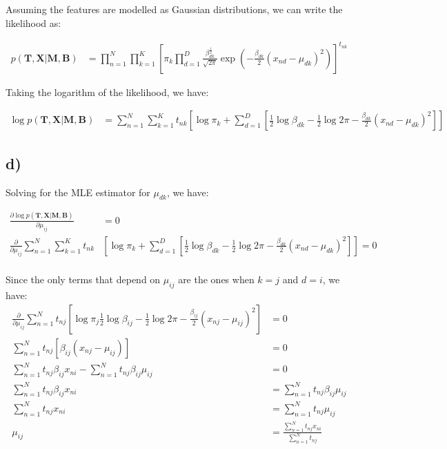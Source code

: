 \documentclass[12pt,a4paper,oneside]{paper}
\begin{document}
Assuming the features are modelled as Gaussian distributions, we can write the likelihood as:

\begin{align*}
    p(\bm{T}, \bm{X} | \bm{M}, \bm{B}) &= \prod_{n=1}^{N} \prod_{k=1}^{K} [\pi_k \prod_{d=1}^{D} \frac{\beta_{dk}^{\frac{1}{2}}}{\sqrt{2\pi}} \exp\left(-\frac{\beta_{dk}}{2} (x_{nd} - \mu_{dk})^2\right)]^{t_{nk}}
\end{align*}

Taking the logarithm of the likelihood, we have:

\begin{align*}
    \log p(\bm{T}, \bm{X} | \bm{M}, \bm{B}) &= \sum_{n=1}^{N} \sum_{k=1}^{K} t_{nk} \left[\log \pi_k + \sum_{d=1}^{D} \left[\frac{1}{2} \log \beta_{dk} - \frac{1}{2} \log 2\pi - \frac{\beta_{dk}}{2} (x_{nd} - \mu_{dk})^2\right]\right]
\end{align*}

\newpage
\subsection*{d)}

Solving for the MLE estimator for $\mu_{dk}$, we have:

\begin{align*}
    \frac{\partial \log p(\bm{T}, \bm{X} | \bm{M}, \bm{B})}{\partial \mu_{ij}} &= 0 \\
    \frac{\partial}{\partial \mu_{ij}} \sum_{n=1}^{N} \sum_{k=1}^{K} t_{nk} &\left[\log \pi_k + \sum_{d=1}^{D} \left[\frac{1}{2} \log \beta_{dk} - \frac{1}{2} \log 2\pi - \frac{\beta_{dk}}{2} (x_{nd} - \mu_{dk})^2\right]\right] = 0 \\
\end{align*}

Since the only terms that depend on $\mu_{ij}$ are the ones when $k=j$ and $d=i$, we have:
\begin{align*}
    \frac{\partial}{\partial \mu_{ij}} \sum_{n=1}^{N} t_{nj} \left[\log \pi_j \frac{1}{2} \log \beta_{ij} - \frac{1}{2} \log 2\pi - \frac{\beta_{ij}}{2} (x_{nj} - \mu_{ij})^2\right] &= 0 \\
    \sum_{n=1}^{N} t_{nj} \left[ \beta_{ij} (x_{nj} - \mu_{ij})\right] &= 0 \\
    \sum_{n=1}^{N} t_{nj} \beta_{ij} x_{ni} - \sum_{n=1}^{N} t_{nj} \beta_{ij} \mu_{ij} &= 0 \\
    \sum_{n=1}^{N} t_{nj} \beta_{ij} x_{ni} &= \sum_{n=1}^{N} t_{nj} \beta_{ij} \mu_{ij} \\
    \sum_{n=1}^{N} t_{nj} x_{ni} &= \sum_{n=1}^{N} t_{nj} \mu_{ij} \\
    \mu_{ij} &= \frac{\sum_{n=1}^{N} t_{nj} x_{ni}}{\sum_{n=1}^{N} t_{nj}}
\end{align*}
\end{document}
